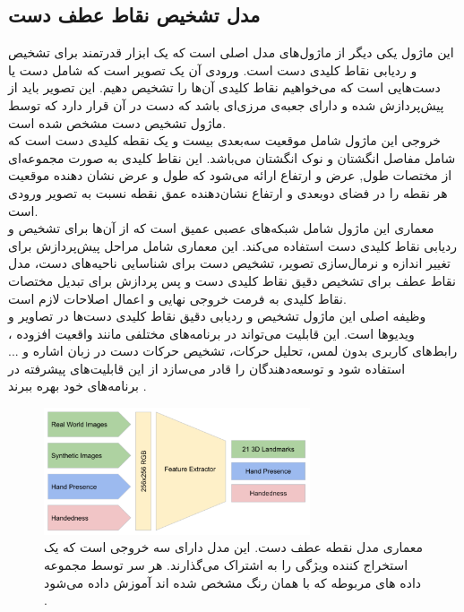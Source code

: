 \subsection{مدل تشخیص نقاط عطف دست}
این ماژول یکی دیگر از ماژول‌های مدل اصلی است که یک ابزار قدرتمند برای تشخیص و ردیابی نقاط کلیدی دست است. ورودی آن یک تصویر است که شامل دست یا دست‌هایی 
است که می‌خواهیم نقاط کلیدی آن‌ها را تشخیص دهیم. این تصویر باید از پیش‌پردازش شده و دارای جعبه‌ی مرزی‌ای باشد که دست در آن قرار دارد که توسط ماژول تشخیص دست مشخص شده است.
\\
خروجی این ماژول شامل موقعیت سه‌بعدی بیست و یک نقطه کلیدی دست است که شامل مفاصل انگشتان و نوک انگشتان می‌باشد. این نقاط کلیدی به صورت مجموعه‌ای از مختصات طول, عرض و ارتفاع ارائه می‌شود 
که طول و عرض نشان دهنده موقعیت هر نقطه را در فضای دوبعدی و ارتفاع نشان‌دهنده عمق نقطه نسبت به تصویر ورودی است.
\\
معماری این ماژول شامل  شبکه‌های عصبی عمیق است که از آن‌ها برای تشخیص و ردیابی نقاط کلیدی دست استفاده می‌کند. این معماری شامل مراحل پیش‌پردازش برای تغییر اندازه و نرمال‌سازی تصویر، تشخیص دست برای شناسایی ناحیه‌های دست، مدل 
نقاط عطف برای تشخیص دقیق نقاط کلیدی دست و پس‌ پردازش برای تبدیل مختصات نقاط کلیدی به فرمت خروجی نهایی و اعمال اصلاحات لازم است.
\\
وظیفه اصلی این ماژول تشخیص و ردیابی دقیق نقاط کلیدی دست‌ها در تصاویر و ویدیوها است. این قابلیت می‌تواند در برنامه‌های مختلفی مانند واقعیت افزوده ، رابط‌های کاربری بدون لمس،
تحلیل حرکات، تشخیص حرکات دست در زبان اشاره و ... استفاده شود و توسعه‌دهندگان را قادر می‌سازد از این قابلیت‌های پیشرفته در برنامه‌های خود بهره ببرند \cite{zhang2020mediapipe}.

\begin{figure}[h]
    \centering
    \includegraphics[width=0.7\textwidth]{landmark.png}
    \caption[معماری مدل نقطه عطف دست]{معماری مدل نقطه عطف دست. این مدل دارای سه خروجی است که یک استخراج کننده ویژگی را به اشتراک می‌گذارند. هر سر توسط مجموعه داده های مربوطه که با همان رنگ مشخص شده اند آموزش داده می‌شود \cite{zhang2020mediapipe}.}
\end{figure}

